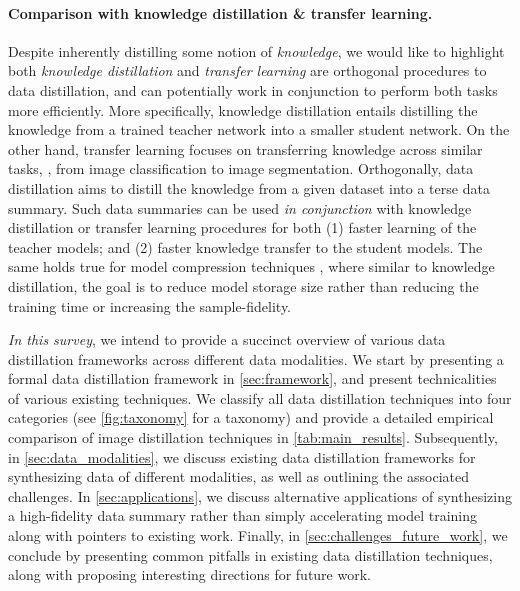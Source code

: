 \documentclass[10pt]{article} %
\begin{document}
\paragraph{Comparison with knowledge distillation \& transfer learning.} Despite inherently distilling some notion of \emph{knowledge}, we would like to highlight both \emph{knowledge distillation} and \emph{transfer learning} are orthogonal procedures to data distillation, and can potentially work in conjunction to perform both tasks more efficiently. More specifically, knowledge distillation \citep{knowledge_distillation} entails distilling the knowledge from a trained teacher network into a smaller student network. On the other hand, transfer learning \citep{transfer_learning} focuses on transferring knowledge across similar tasks, \eg, from image classification to image segmentation. Orthogonally, data distillation aims to distill the knowledge from a given dataset into a terse data summary. Such data summaries can be used \emph{in conjunction} with knowledge distillation or transfer learning procedures for both (1) faster learning of the teacher models; and (2) faster knowledge transfer to the student models. The same holds true for model compression techniques \citep{model_compression}, where similar to knowledge distillation, the goal is to reduce model storage size rather than reducing the training time or increasing the sample-fidelity.

\vspace{0.001cm}
\emph{In this survey}, we intend to provide a succinct overview of various data distillation frameworks across different data modalities. We start by presenting a formal data distillation framework in \cref{sec:framework}, and present technicalities of various existing techniques. We classify all data distillation techniques into four categories (see \cref{fig:taxonomy} for a taxonomy) and provide a detailed empirical comparison of image distillation techniques in \cref{tab:main_results}. Subsequently, in \cref{sec:data_modalities}, we discuss existing data distillation frameworks for synthesizing data of different modalities, as well as outlining the associated challenges. In \cref{sec:applications}, we discuss alternative applications of synthesizing a high-fidelity data summary rather than simply accelerating model training along with pointers to existing work. Finally, in \cref{sec:challenges_future_work}, we conclude by presenting common pitfalls in existing data distillation techniques, along with proposing interesting directions for future work.
\end{document}
